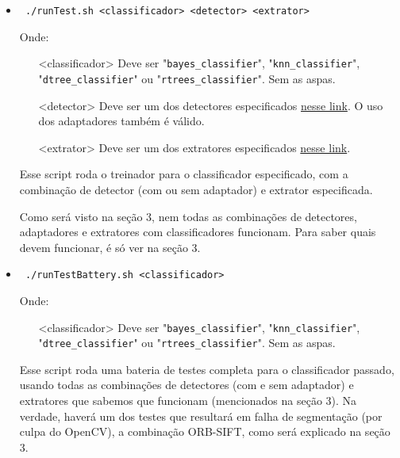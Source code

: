 \documentclass[a4paper,11pt]{article}
\begin{document}
    \begin{itemize}
      \item \verb| ./runTest.sh <classificador> <detector> <extrator> |

      Onde:
      \begin{itemize}
        \item[<classificador>]
          Deve ser "\verb$bayes_classifier$", "\verb$knn_classifier$", \\
          "\verb$dtree_classifier$" ou "\verb$rtrees_classifier$". Sem as aspas.
        \item[<detector>]
          Deve ser um dos detectores especificados \href{
          http://docs.opencv.org/modules/features2d/doc/common_interfaces_of_feature_detectors.html#featuredetector-create
          }{nesse link}. O uso dos adaptadores também é válido.
        \item[<extrator>]
          Deve ser um dos extratores especificados \href{
          http://docs.opencv.org/modules/features2d/doc/common_interfaces_of_descriptor_extractors.html#descriptorextractor-create
          }{nesse link}.
      \end{itemize}
      Esse script roda o treinador para o classificador especificado, com a
      combinação de detector (com ou sem adaptador) e extrator especificada.

      Como será visto na seção 3, nem todas as combinações de detectores,
      adaptadores e extratores com classificadores funcionam. Para saber quais
      devem funcionar, é só ver na seção 3.

      \item \verb| ./runTestBattery.sh <classificador>|

      Onde:
      \begin{itemize}
        \item[<classificador>]
          Deve ser "\verb$bayes_classifier$", "\verb$knn_classifier$", \\
          "\verb$dtree_classifier$" ou "\verb$rtrees_classifier$". Sem as aspas.
      \end{itemize}
      Esse script roda uma bateria de testes completa para o classificador
      passado, usando todas as combinações de detectores (com e sem adaptador)
      e extratores que sabemos que funcionam (mencionados na seção 3). Na
      verdade, haverá um dos testes que resultará em falha de segmentação (por
      culpa do OpenCV), a combinação ORB-SIFT, como será explicado na seção 3.



\end{itemize}
\end{document}
